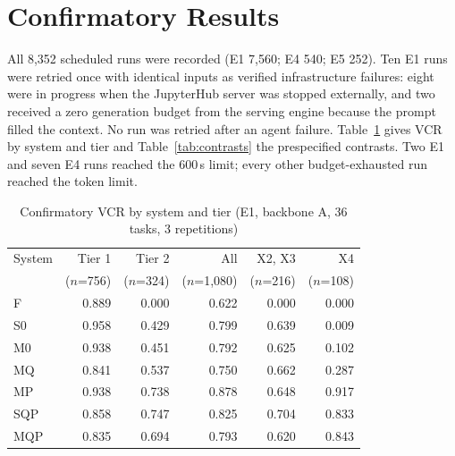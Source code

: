 \documentclass[conference]{IEEEtran}
\newcommand{\sys}[1]{\textsf{#1}}
\begin{document}
\section{Confirmatory Results}
\label{sec:results}
All 8,352 scheduled runs were recorded (E1 7,560; E4 540; E5 252). Ten E1 runs were retried once with identical
inputs as verified infrastructure failures: eight were in progress when the JupyterHub server was stopped externally,
and two received a zero generation budget from the serving engine because the prompt filled the context. No run was
retried after an agent failure. Table~\ref{tab:main} gives VCR by system and tier and Table~\ref{tab:contrasts} the
prespecified contrasts. Two E1 and seven E4 runs reached the 600\,s limit; every other budget-exhausted run
reached the token limit.

\begin{table}[t]
\caption{Confirmatory VCR by system and tier (E1, backbone A, 36 tasks, 3 repetitions)}
\label{tab:main}
\centering\footnotesize\setlength{\tabcolsep}{4pt}
\begin{tabular}{@{}lrrrrr@{}}
\toprule
System & Tier 1 & Tier 2 & All & X2, X3 & X4 \\
 & ($n$=756) & ($n$=324) & ($n$=1,080) & ($n$=216) & ($n$=108) \\
\midrule
\sys{F}   & 0.889 & 0.000 & 0.622 & 0.000 & 0.000 \\
\sys{S0}  & 0.958 & 0.429 & 0.799 & 0.639 & 0.009 \\
\sys{M0}  & 0.938 & 0.451 & 0.792 & 0.625 & 0.102 \\
\sys{MQ}  & 0.841 & 0.537 & 0.750 & 0.662 & 0.287 \\
\sys{MP}  & 0.938 & 0.738 & 0.878 & 0.648 & 0.917 \\
\sys{SQP} & 0.858 & 0.747 & 0.825 & 0.704 & 0.833 \\
\sys{MQP} & 0.835 & 0.694 & 0.793 & 0.620 & 0.843 \\
\bottomrule
\end{tabular}
\end{table}
\end{document}

